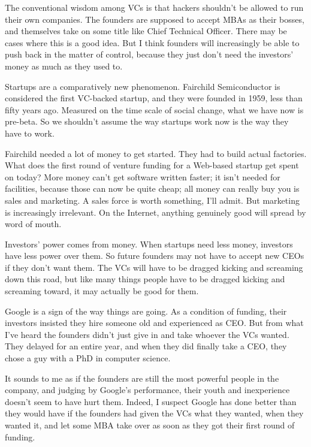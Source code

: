 \documentclass[12pt]{book}
\begin{document}
The conventional wisdom among VCs is that hackers shouldn't be allowed
to run their own companies. The founders are supposed to accept MBAs as
their bosses, and themselves take on some title like Chief Technical
Officer. There may be cases where this is a good idea. But I think
founders will increasingly be able to push back in the matter of
control, because they just don't need the investors' money as much as
they used to.

Startups are a comparatively new phenomenon. Fairchild Semiconductor is
considered the first VC-backed startup, and they were founded in 1959,
less than fifty years ago. Measured on the time scale of social change,
what we have now is pre-beta. So we shouldn't assume the way startups
work now is the way they have to work.

Fairchild needed a lot of money to get started. They had to build actual
factories. What does the first round of venture funding for a Web-based
startup get spent on today? More money can't get software written
faster; it isn't needed for facilities, because those can now be quite
cheap; all money can really buy you is sales and marketing. A sales
force is worth something, I'll admit. But marketing is increasingly
irrelevant. On the Internet, anything genuinely good will spread by word
of mouth.

Investors' power comes from money. When startups need less money,
investors have less power over them. So future founders may not have to
accept new CEOs if they don't want them. The VCs will have to be dragged
kicking and screaming down this road, but like many things people have
to be dragged kicking and screaming toward, it may actually be good for
them.

Google is a sign of the way things are going. As a condition of funding,
their investors insisted they hire someone old and experienced as CEO.
But from what I've heard the founders didn't just give in and take
whoever the VCs wanted. They delayed for an entire year, and when they
did finally take a CEO, they chose a guy with a PhD in computer science.

It sounds to me as if the founders are still the most powerful people in
the company, and judging by Google's performance, their youth and
inexperience doesn't seem to have hurt them. Indeed, I suspect Google
has done better than they would have if the founders had given the VCs
what they wanted, when they wanted it, and let some MBA take over as
soon as they got their first round of funding.
\end{document}

